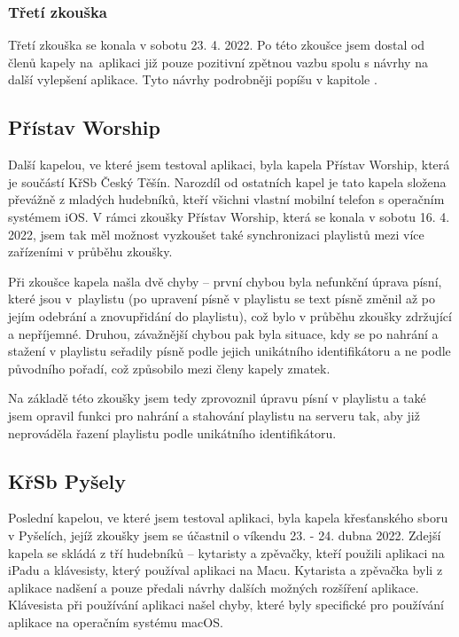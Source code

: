 \subsubsection{Třetí zkouška}

Třetí zkouška se konala v sobotu 23. 4. 2022. Po této zkoušce jsem dostal od členů kapely na~aplikaci již pouze pozitivní zpětnou vazbu spolu s návrhy na další vylepšení aplikace. Tyto návrhy podrobněji popíšu v kapitole .

\subsection{Přístav Worship}

Další kapelou, ve které jsem testoval aplikaci, byla kapela Přístav Worship, která je součástí KřSb Český Těšín. Narozdíl od ostatních kapel je tato kapela složena převážně z mladých hudebníků, kteří všichni vlastní mobilní telefon s operačním systémem iOS. V rámci zkoušky Přístav Worship, která se konala v sobotu 16. 4. 2022, jsem tak měl možnost vyzkoušet také synchronizaci playlistů mezi více zařízeními v průběhu zkoušky.

Při zkoušce kapela našla dvě chyby -- první chybou byla nefunkční úprava písní, které jsou v~playlistu (po upravení písně v playlistu se text písně změnil až po jejím odebrání a znovupřidání do playlistu), což bylo v průběhu zkoušky zdržující a nepříjemné. Druhou, závažnější chybou pak byla situace, kdy se po nahrání a stažení v playlistu seřadily písně podle jejich unikátního identifikátoru a ne podle původního pořadí, což způsobilo mezi členy kapely zmatek.

Na základě této zkoušky jsem tedy zprovoznil úpravu písní v playlistu a také jsem opravil funkci pro nahrání a stahování playlistu na serveru tak, aby již neprováděla řazení playlistu podle unikátního identifikátoru.

\subsection{KřSb Pyšely}

Poslední kapelou, ve které jsem testoval aplikaci, byla kapela křesťanského sboru v Pyšelích, jejíž zkoušky jsem se účastnil o víkendu 23. - 24. dubna 2022. Zdejší kapela se skládá z tří hudebníků -- kytaristy a zpěvačky, kteří použili aplikaci na iPadu a klávesisty, který používal aplikaci na Macu. Kytarista a zpěvačka byli z aplikace nadšení a pouze předali návrhy dalších možných rozšíření aplikace. Klávesista při používání aplikaci našel chyby, které byly specifické pro používání aplikace na operačním systému macOS.

